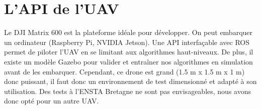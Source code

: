 \section{L'API de l'UAV}

Le DJI Matrix 600 est la plateforme idéale pour développer. On peut embarquer un
ordinateur (Raspberry Pi, NVIDIA Jetson). Une API interfaçable avec ROS permet de
piloter l’UAV en se limitant aux algorithmes haut-niveaux. De plus, il existe un modèle
Gazebo pour valider et entraîner nos algorithmes en simulation avant de les embarquer.
Cependant, ce drone est grand (1.5 m x 1.5 m x 1 m) donc puissant, il faut donc un
environnement de test dimensionné et adapté à son utilisation. Des tests à l’ENSTA
Bretagne ne sont pas envisageables, nous avons donc opté pour un autre UAV. 

